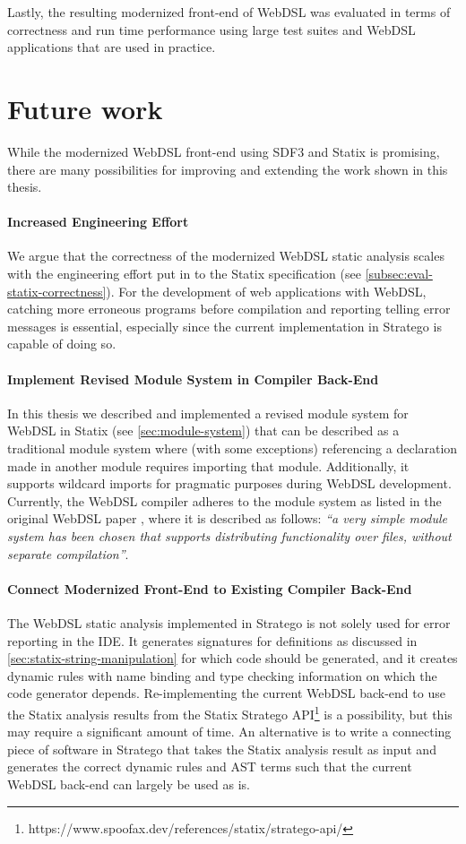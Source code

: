   Lastly, the resulting modernized front-end of WebDSL was evaluated in terms of correctness and run time performance using large test suites and WebDSL applications that are used in practice.

  \section{\label{sec:future-work}Future work}

  While the modernized WebDSL front-end using SDF3 and Statix is promising, there are many possibilities for improving and extending the work shown in this thesis.

  \paragraph{Increased Engineering Effort} We argue that the correctness of the modernized WebDSL static analysis scales with the engineering effort put in to the Statix specification (see \cref{subsec:eval-statix-correctness}). For the development of web applications with WebDSL, catching more erroneous programs before compilation and reporting telling error messages is essential, especially since the current implementation in Stratego is capable of doing so.

  \paragraph{Implement Revised Module System in Compiler Back-End} In this thesis we described and implemented a revised module system for WebDSL in Statix (see \cref{sec:module-system}) that can be described as a traditional module system where (with some exceptions) referencing a declaration made in another module requires importing that module. Additionally, it supports wildcard imports for pragmatic purposes during WebDSL development. Currently, the WebDSL compiler adheres to the module system as listed in the original WebDSL paper \autocite{Visser2007}, where it is described as follows: \textit{``a very simple module system has been chosen that supports distributing functionality over files, without separate compilation''}. 

  \paragraph{Connect Modernized Front-End to Existing Compiler Back-End} The WebDSL static analysis implemented in Stratego is not solely used for error reporting in the IDE. It generates signatures for definitions as discussed in \cref{sec:statix-string-manipulation} for which code should be generated, and it creates dynamic rules with name binding and type checking information on which the code generator depends. Re-implementing the current WebDSL back-end to use the Statix analysis results from the Statix Stratego API\footnote{https://www.spoofax.dev/references/statix/stratego-api/} is a possibility, but this may require a significant amount of time. An alternative is to write a connecting piece of software in Stratego that takes the Statix analysis result as input and generates the correct dynamic rules and AST terms such that the current WebDSL back-end can largely be used as is.

